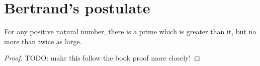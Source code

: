 \chapter{Bertrand's postulate}

\begin{theorem}
    \label{thm:bertrands_postulate}
    \leanok
    For any positive natural number, there is a prime which is greater than
    it, but no more than twice as large.
\end{theorem}
\begin{proof}
    \leanok
    TODO: make this follow the book proof more closely!
\end{proof}